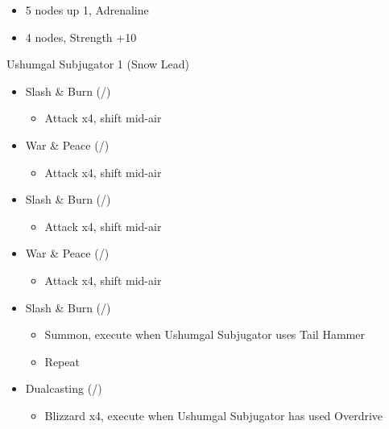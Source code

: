 \begin{multicols}{2}
\begin{menu}
\begin{itemize}
\begin{itemize}
\begin{itemize}
                      \begin{itemize}
                        \item 5 nodes up 1, Adrenaline
                        \item 4 nodes, Strength +10
                      \end{itemize}
              \end{itemize}
      \end{itemize}
    \end{itemize}
  \end{menu}
  \renewcommand{\first}{[1] Slash \& Burn (\com/\rav)}
  \renewcommand{\second}{[2] War \& Peace (\com/\med)}
  \renewcommand{\fifth}{[5] Dualcasting (\rav/\rav)}
  \renewcommand{\sixth}{[6] Dualcasting (\rav/\rav)}
  \begin{battle}[1:23]{Ushumgal Subjugator 1 (Snow Lead)}
    \begin{itemize}
      \item \first
            \begin{itemize}
              \item Attack x4, shift mid-air
            \end{itemize}
      \item \second
            \begin{itemize}
              \item Attack x4, shift mid-air
            \end{itemize}
      \item \first
            \begin{itemize}
              \item Attack x4, shift mid-air
            \end{itemize}
      \item \second
            \begin{itemize}
              \item Attack x4, shift mid-air
            \end{itemize}
      \item \first
            \begin{itemize}
              \item Summon, execute when Ushumgal Subjugator uses Tail Hammer
              \item Repeat
            \end{itemize}
      \item \fifth
            \begin{itemize}
              \item Blizzard x4, execute when Ushumgal Subjugator has used Overdrive

\end{itemize}
\end{itemize}
\end{battle}
\end{multicols}
